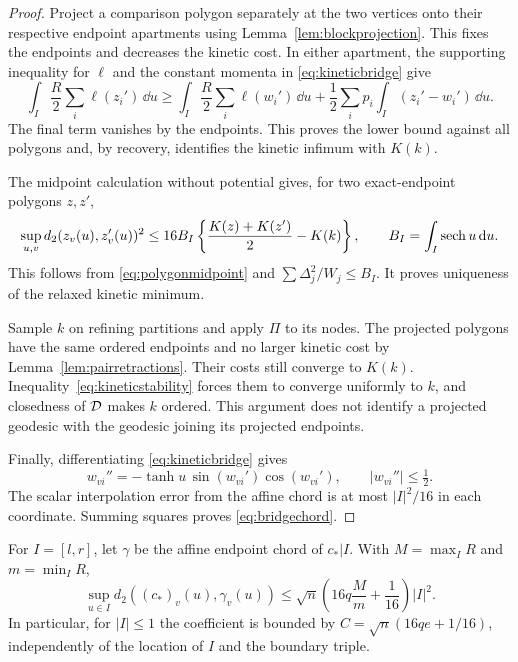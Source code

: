 \begin{proof}
Project a comparison polygon separately at the two vertices onto
their respective endpoint apartments using
Lemma~\ref{lem:blockprojection}. This fixes the endpoints and
decreases the kinetic cost. In either apartment, the supporting
inequality for $\ell$ and the constant momenta in
\eqref{eq:kineticbridge} give
\[
 \int_I\frac R2\sum_i\ell(z_i')\,\dd u
 \ge\int_I\frac R2\sum_i\ell(w_i')\,\dd u
       +\frac12\sum_i p_i\int_I(z_i'-w_i')\,\dd u.
\]
The final term vanishes by the endpoints. This proves the lower
bound against all polygons and, by recovery, identifies the kinetic
infimum with $K(k)$.

The midpoint calculation without potential gives, for two
exact-endpoint polygons $z,z'$,
\begin{equation}\label{eq:kineticstability}
 \sup_{u,v}d_2(z_v(u),z'_v(u))^2
 \le16B_I\left\{\frac{K(z)+K(z')}{2}-K(k)\right\},
 \qquad B_I=\int_I\operatorname{sech} u\,\mathrm d u.
\end{equation}
This follows from \eqref{eq:polygonmidpoint} and
$\sum\Delta_j^2/W_j\le B_I$. It proves uniqueness of the relaxed
kinetic minimum.

Sample $k$ on refining partitions and apply $\Pi$ to its nodes.
The projected polygons have the same ordered endpoints and no larger
kinetic cost by Lemma~\ref{lem:pairretractions}. Their costs still
converge to $K(k)$. Inequality~\eqref{eq:kineticstability} forces
them to converge uniformly to $k$, and closedness of $\mathcal D$ makes
$k$ ordered. This argument does not identify a projected geodesic
with the geodesic joining its projected endpoints.

Finally, differentiating \eqref{eq:kineticbridge} gives
\[
 w_{vi}''=-\tanh u\,\sin(w_{vi}')\cos(w_{vi}'),
 \qquad |w_{vi}''|\le\tfrac12.
\]
The scalar interpolation error from the affine chord is at most
$|I|^2/16$ in each coordinate. Summing squares proves
\eqref{eq:bridgechord}.
\end{proof}

\begin{proposition}\label{prop:quadraticchord}
For $I=[l,r]$, let $\gamma$ be the affine endpoint chord of $c_*|I$.
With $M=\max_I R$ and $m=\min_I R$,
\begin{equation}\label{eq:quadraticchord}
 \sup_{u\in I}d_2((c_*)_v(u),\gamma_v(u))
 \le\sqrt n\left(16q\frac M m+\frac1{16}\right)|I|^2.
\end{equation}
In particular, for $|I|\le1$ the coefficient is bounded by
$C=\sqrt n(16qe+1/16)$, independently of the location of $I$ and
the boundary triple.
\end{proposition}

